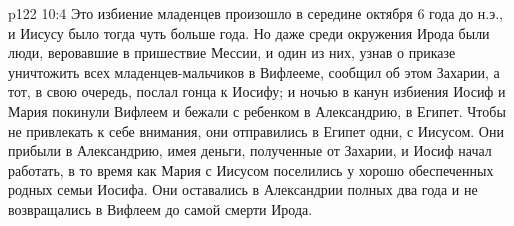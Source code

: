\vs p122 10:4 Это избиение младенцев произошло в середине октября 6 года до н.э., и Иисусу было тогда чуть больше года. Но даже среди окружения Ирода были люди, веровавшие в пришествие Мессии, и один из них, узнав о приказе уничтожить всех младенцев\hyp{}мальчиков в Вифлееме, сообщил об этом Захарии, а тот, в свою очередь, послал гонца к Иосифу; и ночью в канун избиения Иосиф и Мария покинули Вифлеем и бежали с ребенком в Александрию, в Египет. Чтобы не привлекать к себе внимания, они отправились в Египет одни, с Иисусом. Они прибыли в Александрию, имея деньги, полученные от Захарии, и Иосиф начал работать, в то время как Мария с Иисусом поселились у хорошо обеспеченных родных семьи Иосифа. Они оставались в Александрии полных два года и не возвращались в Вифлеем до самой смерти Ирода.
